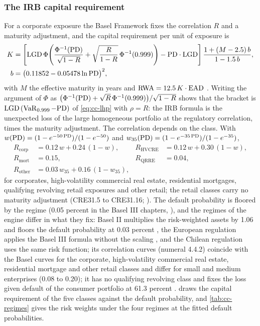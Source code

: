 \subsubsection{The IRB capital requirement}

For a corporate exposure the Basel Framework fixes the correlation $R$ and a maturity adjustment, and the capital requirement per unit
of exposure is
\begin{equation}
\begin{aligned}
K&=\left[\mathrm{LGD}\,\Phi\!\left(\frac{\Phi^{-1}(\mathrm{PD})}{\sqrt{1-R}}+\sqrt{\frac{R}{1-R}}\,\Phi^{-1}(0.999)\right)-\mathrm{PD}\cdot\mathrm{LGD}\right]
\frac{1+(M - 2.5)\,b}{1-1.5\,b},\\
b&=\big(0.11852-0.05478\ln\mathrm{PD}\big)^2,
\end{aligned}
\label{eq:cc-irb}
\end{equation}
with $M$ the effective maturity in years and $\mathrm{RWA}=12.5\,K\cdot\mathrm{EAD}$ \citep{ratings:bcbs2005,credit-capital:basel-cre31}.
Writing the argument of $\Phi$ as $\big(\Phi^{-1}(\mathrm{PD})+\sqrt{R}\,\Phi^{-1}(0.999)\big)/\sqrt{1-R}$ shows that the bracket is
$\mathrm{LGD}\,(\operatorname{VaR}_{0.999}-\mathrm{PD})$ of \cref{eq:cc-lhp} with $\rho=R$: the IRB formula is the unexpected loss of the large homogeneous portfolio
at the regulatory correlation, times the maturity adjustment. The correlation depends on the class. With
$w(\mathrm{PD})=(1-e^{-50\,\mathrm{PD}})/(1-e^{-50})$ and $w_{35}(\mathrm{PD})=(1-e^{-35\,\mathrm{PD}})/(1-e^{-35})$,
\begin{equation}
\begin{aligned}
R_{\mathrm{corp}}&=0.12\,w+0.24\,(1-w),& R_{\mathrm{HVCRE}}&=0.12\,w+0.30\,(1-w),\\
R_{\mathrm{mort}}&=0.15,& R_{\mathrm{QRRE}}&=0.04,\\
R_{\mathrm{other}}&=0.03\,w_{35}+0.16\,(1-w_{35}),
\end{aligned}
\label{eq:cc-corr}
\end{equation}
for corporates, high-volatility commercial real estate, residential mortgages, qualifying revolving retail exposures and other retail;
the retail classes carry no maturity adjustment (CRE31.5 to CRE31.16; \citealp{credit-capital:basel-cre31}). The default probability
is floored by the regime (0.05 percent in the Basel III chapters, \citealp{credit-capital:basel-cre32}), and the regimes of the engine
differ in what they fix: Basel II multiplies the risk-weighted assets by 1.06 and floors the default probability at 0.03 percent
\citep{credit-capital:basel-cre30}, the European regulation applies the Basel III formula without the scaling \citep{credit-capital:crr3},
and the Chilean regulation uses the same risk function; its correlation curves (numeral 4.4.2) coincide with the Basel curves for the corporate,
high-volatility commercial real estate, residential mortgage and other retail classes and differ for small and medium enterprises (0.08 to 0.20); it has no
qualifying revolving class and fixes the loss given default of the consumer portfolio at 61.3 percent \citep{credit-capital:cmf-ran21-6}.  draws the capital requirement of the five classes
against the default probability, and \cref{tab:cc-regimes} gives the risk weights under the four regimes at the fitted default
probabilities.

